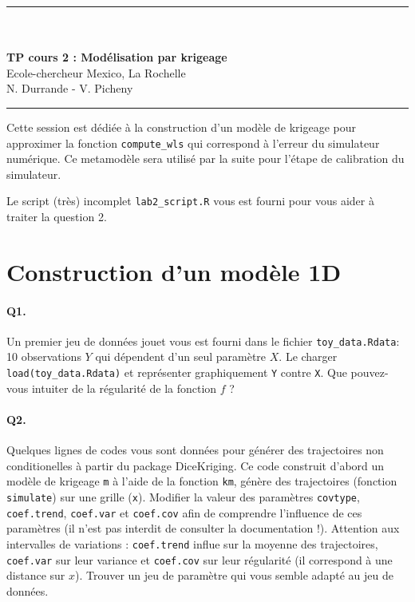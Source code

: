 \documentclass[12pt]{scrartcl}
\begin{document}
\begin{center}
	\rule{\textwidth}{1pt}
	\\ \ \\
	{\LARGE \textbf{TP cours 2 : Modélisation par krigeage}}\\
	\vspace{3mm}
	{\large Ecole-chercheur Mexico, La Rochelle \\ \vspace{3mm}}
	{\normalsize N. Durrande - V. Picheny}\\
	\vspace{3mm}
	\rule{\textwidth}{1pt}
	\vspace{5mm}
\end{center}
Cette session est dédiée à la construction d'un modèle de krigeage pour approximer la fonction  \texttt{compute\_wls} qui correspond à l'erreur du simulateur numérique. Ce metamodèle sera utilisé par la suite pour l'étape de calibration du simulateur.

Le script (très) incomplet \texttt{lab2\_script.R} vous est fourni pour vous aider à traiter la question 2.
\section{Construction d'un modèle 1D}

\paragraph{Q1.} Un premier jeu de données jouet vous est fourni dans le fichier \texttt{toy\_data.Rdata}: 10 observations $Y$ qui dépendent d'un seul paramètre $X$. 
Le charger \texttt{load(toy\_data.Rdata)} et représenter graphiquement \texttt{Y} contre \texttt{X}. Que pouvez-vous intuiter de la régularité de la fonction $f$ ?

\paragraph{Q2.} Quelques lignes de codes vous sont données pour générer des trajectoires non conditionelles à partir du package DiceKriging. Ce code construit d'abord un modèle de krigeage \texttt{m} à l'aide de la fonction \texttt{km},
génère des trajectoires (fonction \texttt{simulate}) sur une grille (\texttt{x}). Modifier la valeur des paramètres \texttt{covtype}, \texttt{coef.trend}, \texttt{coef.var} et \texttt{coef.cov} 
afin de comprendre l'influence de ces paramètres (il n'est pas interdit de consulter la documentation !). Attention aux intervalles de variations : \texttt{coef.trend} influe sur la moyenne des trajectoires, \texttt{coef.var} sur leur variance
et \texttt{coef.cov} sur leur régularité (il correspond à une distance sur $x$). Trouver un jeu de paramètre qui vous semble adapté au jeu de données.
\end{document}
